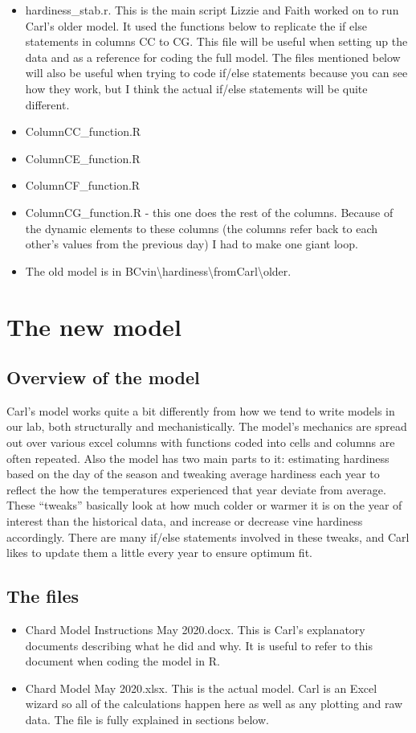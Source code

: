 \documentclass[11pt,letter]{article}
\begin{document}
\begin{itemize} 
	\item hardiness\_stab.r. This is the main script Lizzie and Faith worked on to run Carl's older model. It used the functions below to replicate the if else statements in columns CC to CG. This file will be useful when setting up the data and as a reference for coding the full model. The files mentioned below will also be useful when trying to code if/else statements because you can see how they work, but I think the actual if/else statements will be quite different.     

	\item ColumnCC\_function.R
	\item ColumnCE\_function.R
	\item ColumnCF\_function.R
	\item ColumnCG\_function.R - this one does the rest of the columns. Because of the dynamic elements to these columns (the columns refer back to each other's values from the previous day) I had to make one giant loop.

	\item The old model is in BCvin\textbackslash hardiness\textbackslash fromCarl\textbackslash older.
\end{itemize}

\section{The new model}

\subsection{Overview of the model}
Carl's model works quite a bit differently from how we tend to write models in our lab, both structurally and mechanistically. The model's mechanics are spread out over various excel columns with functions coded into cells and columns are often repeated. Also the model has two main parts to it: estimating hardiness based on the day of the season and tweaking average hardiness each year to reflect the how the temperatures experienced that year deviate from average. These ``tweaks'' basically look at how much colder or warmer it is on the year of interest than the historical data, and increase or decrease vine hardiness accordingly. There are many if/else statements involved in these tweaks, and Carl likes to update them a little every year to ensure optimum fit.  

\subsection{The files}
\begin{itemize}
	\item Chard Model Instructions May 2020.docx. This is Carl's explanatory documents describing what he did and why. It is useful to refer to this document when coding the model in R. 
	\item Chard Model May 2020.xlsx. This is the actual model. Carl is an Excel wizard so all of the calculations happen here as well as any plotting and raw data. The file is fully explained in sections below.
\end{itemize}
\end{document}
